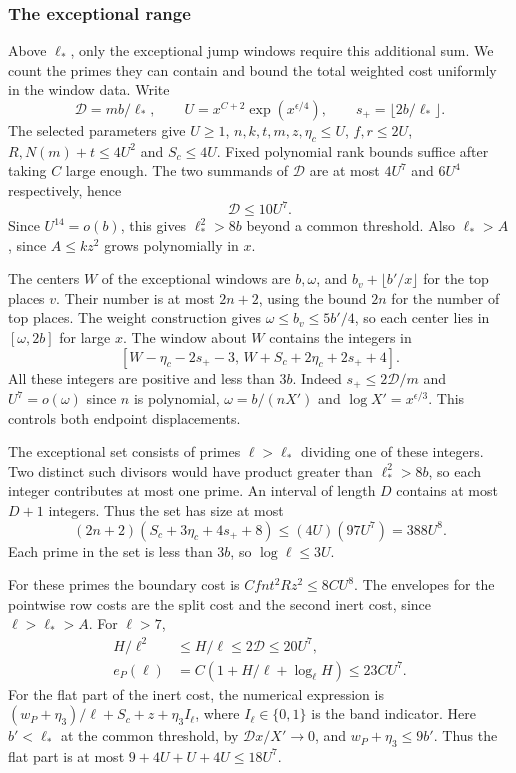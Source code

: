 \subsubsection*{The exceptional range}
\label{subsec:exceptional-range}

Above \(\ell_*\), only the exceptional jump windows require this additional sum. We count the primes they can contain and bound the total weighted cost uniformly in the window data. Write
\[
 \mathcal D=mb/\ell_*,\qquad
 U=x^{C+2}\exp(x^{\epsilon/4}),\qquad
 s_+=\lfloor2b/\ell_*\rfloor .
\]
The selected parameters give \(U\ge1\),
\(n,k,t,m,z,\eta_c\le U\), \(f,r\le2U\),
\(R,N(m)+t\le4U^2\) and \(S_c\le4U\).
Fixed polynomial rank bounds suffice after taking
\(C\) large enough. The two summands of \(\mathcal D\)
are at most \(4U^7\) and \(6U^4\) respectively, hence
\[
 \mathcal D\le10U^7.
\]
Since \(U^{14}=o(b)\), this
gives \(\ell_*^2>8b\) beyond a common threshold.
Also \(\ell_*>A\), since \(A\le k z^2\) grows
polynomially in \(x\).

The centers \(W\) of the exceptional windows are
\(b,\omega\), and \(b_v+\lfloor b'/x\rfloor\) for the
top places \(v\). Their number is at most \(2n+2\),
using the bound \(2n\) for the number of top places.
The weight construction gives
\(\omega\le b_v\le 5b'/4\), so each center lies in
\([\omega,2b]\) for large \(x\). The window about \(W\)
contains the integers in
\[
[W-\eta_c-2s_+-3,\,
  W+S_c+2\eta_c+2s_++4].
\]
All these integers are positive and less than \(3b\).
Indeed \(s_+\le2\mathcal D/m\) and
\(U^7=o(\omega)\) since \(n\) is polynomial,
\(\omega=b/(nX')\) and \(\log X'=x^{\epsilon/3}\).
This controls both endpoint displacements.

The exceptional set consists of primes \(\ell>\ell_*\)
dividing one of these integers. Two distinct such
divisors would have product greater than
\(\ell_*^2>8b\), so each integer contributes at most
one prime. An interval of length \(D\) contains at
most \(D+1\) integers. Thus the set has size at most
\[
 (2n+2)(S_c+3\eta_c+4s_++8)
 \le(4U)(97U^7)=388U^8.
\]
Each prime in the set is less than \(3b\), so
\(\log\ell\le3U\).
\label{cor:prime-cost-sums-2}

For these primes the boundary cost is
\(Cfn t^2 R z^2\le8C U^8\). The envelopes for the
pointwise row costs are the split cost and the second
inert cost, since \(\ell>\ell_*>A\). For \(\ell>7\),
\[
\begin{split}
 H/\ell^2 &\le H/\ell \le 2\mathcal D\le20U^7,\\
 e_P(\ell)&=C(1+H/\ell+\log_\ell H)\le23C U^7.
\end{split}
\]
For the flat part of the inert cost, the numerical
expression is
\((w_P+\eta_3)/\ell+S_c+z+\eta_3 I_\ell\),
where \(I_\ell\in\{0,1\}\) is the band indicator.
Here \(b'<\ell_*\) at the common threshold, by
\(\mathcal D x/X'\to0\), and \(w_P+\eta_3\le9b'\).
Thus the flat part is at most
\(9+4U+U+4U\le18U^7\).

